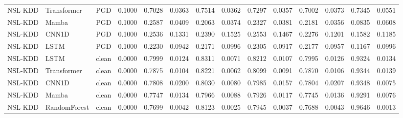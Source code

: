 \begin{table}[ht]
\begin{tabular}{lllrrrrrrrrrrr}
NSL-KDD & Transformer & PGD & 0.1000 & 0.7028 & 0.0363 & 0.7514 & 0.0362 & 0.7297 & 0.0357 & 0.7002 & 0.0373 & 0.7345 & 0.0551 \\
NSL-KDD & Mamba & PGD & 0.1000 & 0.2587 & 0.0409 & 0.2063 & 0.0374 & 0.2327 & 0.0381 & 0.2181 & 0.0356 & 0.0835 & 0.0608 \\
NSL-KDD & CNN1D & PGD & 0.1000 & 0.2536 & 0.1331 & 0.2390 & 0.1525 & 0.2553 & 0.1467 & 0.2276 & 0.1201 & 0.1582 & 0.1185 \\
NSL-KDD & LSTM & PGD & 0.1000 & 0.2230 & 0.0942 & 0.2171 & 0.0996 & 0.2305 & 0.0917 & 0.2177 & 0.0957 & 0.1167 & 0.0996 \\
NSL-KDD & LSTM & clean & 0.0000 & 0.7999 & 0.0124 & 0.8311 & 0.0071 & 0.8212 & 0.0107 & 0.7995 & 0.0126 & 0.9324 & 0.0134 \\
NSL-KDD & Transformer & clean & 0.0000 & 0.7875 & 0.0104 & 0.8221 & 0.0062 & 0.8099 & 0.0091 & 0.7870 & 0.0106 & 0.9344 & 0.0139 \\
NSL-KDD & CNN1D & clean & 0.0000 & 0.7808 & 0.0200 & 0.8030 & 0.0080 & 0.7985 & 0.0157 & 0.7804 & 0.0207 & 0.9348 & 0.0075 \\
NSL-KDD & Mamba & clean & 0.0000 & 0.7747 & 0.0134 & 0.7966 & 0.0088 & 0.7926 & 0.0117 & 0.7745 & 0.0136 & 0.9291 & 0.0076 \\
NSL-KDD & RandomForest & clean & 0.0000 & 0.7699 & 0.0042 & 0.8123 & 0.0025 & 0.7945 & 0.0037 & 0.7688 & 0.0043 & 0.9646 & 0.0013 \\
\bottomrule
\end{tabular}

\end{table}
